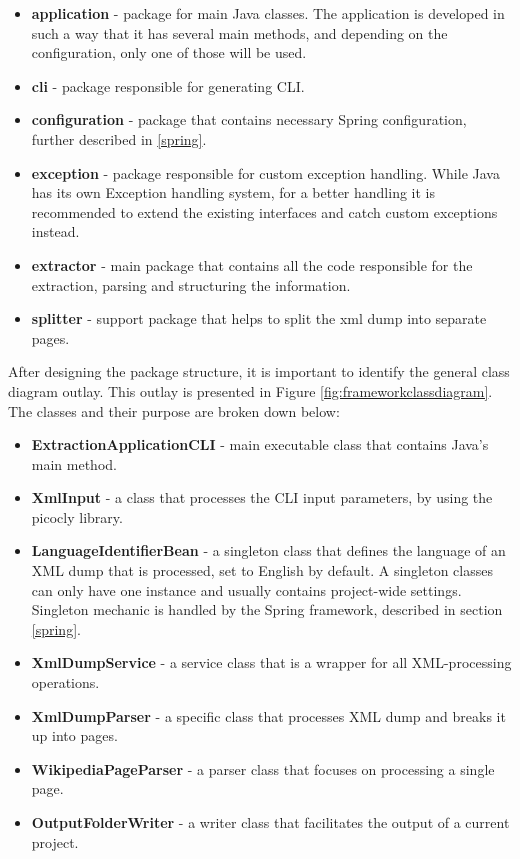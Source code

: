 \documentclass[thesis=M,english,hidelinks]{FITthesis}[2019/12/23]
\begin{document}
\begin{itemize}
	\item \textbf{application} - package for main Java classes. The application is developed in such a way that it has several main methods, and depending on the configuration, only one of those will be used.
	\item \textbf{cli} - package responsible for generating \gls{CLI}.
	\item \textbf{configuration} - package that contains necessary Spring configuration, further described in \ref{spring}.
	\item \textbf{exception} - package responsible for custom exception handling. While Java has its own Exception handling system, for a better handling it is recommended to extend the existing interfaces and catch custom exceptions instead.
	\item \textbf{extractor} - main package that contains all the code responsible for the extraction, parsing and structuring the information.
	\item \textbf{splitter} - support package that helps to split the xml dump into separate pages.
\end{itemize}

After designing the package structure, it is important to identify the general class diagram outlay. This outlay is presented in Figure \ref{fig:frameworkclassdiagram}. The classes and their purpose are broken down below:

\begin{itemize}
	\item \textbf{ExtractionApplicationCLI} - main executable class that contains Java's main method.
	\item \textbf{XmlInput} - a class that processes the \gls{CLI} input parameters, by using the picocly library\cite{picocli_library}.
	\item \textbf{LanguageIdentifierBean} - a singleton class that defines the language of an XML dump that is processed, set to English by default. A singleton classes can only have one instance and usually contains project-wide settings. Singleton mechanic is handled by the Spring framework, described in section \ref{spring}.
	\item \textbf{XmlDumpService} -  a service class that is a wrapper for all XML-processing operations.
	\item \textbf{XmlDumpParser} - a specific class that processes XML dump and breaks it up into pages.
	\item \textbf{WikipediaPageParser} - a parser class that focuses on processing a single page.
	\item \textbf{OutputFolderWriter} - a writer class that facilitates the output of a current project.
\end{itemize}
\end{document}
